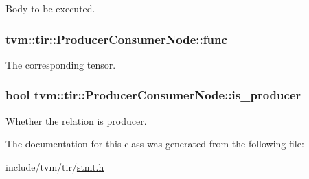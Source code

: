 Body to be executed. 

\subsubsection[{\texorpdfstring{func}{func}}]{ tvm\+::tir\+::\+Producer\+Consumer\+Node\+::func}\hypertarget{classtvm_1_1tir_1_1ProducerConsumerNode_afcbaebd57b61574b9c5a5d9484a99141}{}\label{classtvm_1_1tir_1_1ProducerConsumerNode_afcbaebd57b61574b9c5a5d9484a99141}


The corresponding tensor. 

\subsubsection[{\texorpdfstring{is\+\_\+producer}{is_producer}}]{\setlength{\rightskip}{0pt plus 5cm}bool tvm\+::tir\+::\+Producer\+Consumer\+Node\+::is\+\_\+producer}\hypertarget{classtvm_1_1tir_1_1ProducerConsumerNode_a98b5bfa381b562072ccce2e5c8e68f47}{}\label{classtvm_1_1tir_1_1ProducerConsumerNode_a98b5bfa381b562072ccce2e5c8e68f47}


Whether the relation is producer. 



The documentation for this class was generated from the following file\+:\begin{DoxyCompactItemize}
\item 
include/tvm/tir/\hyperlink{stmt_8h}{stmt.\+h}\end{DoxyCompactItemize}
